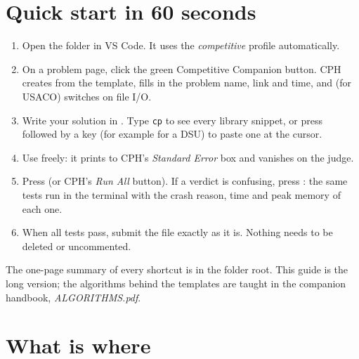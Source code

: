 \section{Quick start in 60 seconds}

\begin{enumerate}[label=\textbf{\color{cpteal}\arabic*.}]
  \item Open the  folder in VS Code. It uses the \emph{competitive} profile automatically.
  \item On a problem page, click the green Competitive Companion button. CPH creates 
        from the template, fills in the problem name, link and time, and (for USACO) switches on file I/O.
  \item Write your solution in . Type \texttt{cp} to see every library snippet, or press
         followed by a key (for example  for a DSU) to paste one at the cursor.
  \item Use  freely: it prints to CPH's \emph{Standard Error} box and vanishes on the judge.
  \item Press  (or CPH's \emph{Run All} button). If a verdict is confusing, press : the same tests
        run in the terminal with the crash reason, time and peak memory of each one.
  \item When all tests pass, submit the file exactly as it is. Nothing needs to be deleted or uncommented.
\end{enumerate}

\begin{tip}
The one-page summary of every shortcut is  in the folder root. This guide is the long version;
the algorithms behind the templates are taught in the companion handbook, \emph{ALGORITHMS.pdf}.
\end{tip}

\section{What is where}

